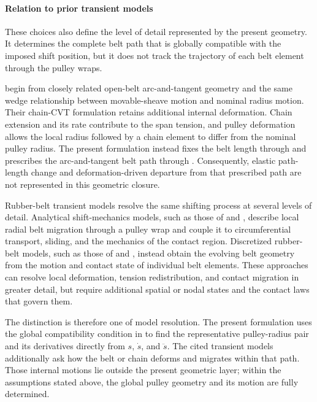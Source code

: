 \documentclass[11pt]{report}
\numberwithin{equation}{section}
\newcounter{assump}
\begin{document}
\paragraph{Relation to prior transient models}

These choices also define the level of detail represented by the present
geometry. It determines the complete belt path that is globally compatible
with the imposed shift position, but it does not track the trajectory of each
belt element through the pulley wraps.

\citet{DuanEtAl2016} begin from closely related open-belt arc-and-tangent
geometry and the same wedge relationship between movable-sheave motion and
nominal radius motion. Their chain-CVT formulation retains additional internal
deformation. Chain extension and its rate contribute to the span tension, and
pulley deformation allows the local radius followed by a chain element to
differ from the nominal pulley radius. The present formulation instead fixes
the belt length through  and prescribes the
arc-and-tangent belt path through . Consequently, elastic
path-length change and deformation-driven departure from that prescribed path
are not represented in this geometric closure.

Rubber-belt transient models resolve the same shifting process at several
levels of detail. Analytical shift-mechanics models, such as those of
\citet{Sorge2008} and \citet{CammalleriSorge2009}, describe local radial belt
migration through a pulley wrap and couple it to circumferential transport,
sliding, and the mechanics of the contact region. Discretized rubber-belt
models, such as those of \citet{JulioPlante2011} and \citet{Ballew2015},
instead obtain the evolving belt geometry from the motion and contact state of
individual belt elements. These approaches can resolve local deformation,
tension redistribution, and contact migration in greater detail, but require
additional spatial or nodal states and the contact laws that govern them.

The distinction is therefore one of model resolution. The present formulation
uses the global compatibility condition in 
to find the representative pulley-radius pair and its derivatives directly
from \(s\), \(\dot s\), and \(\ddot s\). The cited transient models additionally
ask how the belt or chain deforms and migrates within that path. Those internal
motions lie outside the present geometric layer; within the assumptions stated
above, the global pulley geometry and its motion are fully determined.
\end{document}
